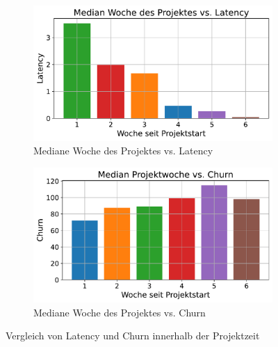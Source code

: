 \begin{figure}[htbp]
    \centering
    \begin{subfigure}[b]{0.48\textwidth}
        \centering
        \includegraphics[width=\textwidth]{Figures/mittelwert-woche-latency.pdf}
        \caption{Mediane Woche des Projektes vs. Latency}
        \label{fig:mittelwert-woche-lateny}
    \end{subfigure}
    \hfill
    \begin{subfigure}[b]{0.48\textwidth}
        \centering
        \includegraphics[width=\textwidth]{Figures/mittelwert-woche-churn.pdf}
        \caption{Mediane Woche des Projektes vs. Churn}
        \label{fig:mittelwert-woche-churn}
    \end{subfigure}
    \caption{Vergleich von Latency und Churn innerhalb der Projektzeit}
    \label{fig:vergleich-latency-churn-projektzeit}
\end{figure}

